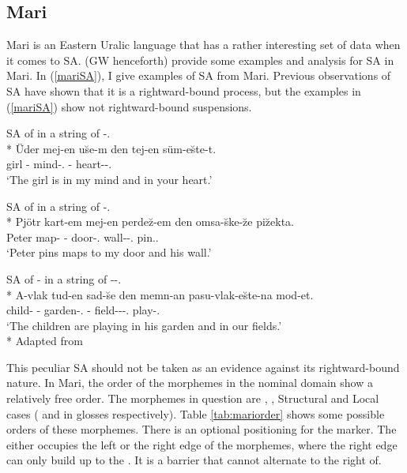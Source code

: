 \subsection{Mari}

Mari is an Eastern Uralic language that has a rather interesting set of data when it comes to SA. \citet{guseva2017postsyntactic} (GW henceforth) provide some examples and analysis for SA in Mari. In (\ref{mariSA}), I give examples of SA from Mari. Previous observations of SA have shown that it is a rightward-bound process, but the examples in (\ref{mariSA}) show not rightward-bound suspensions.

\begin{exe}
    \ex \label{mariSA}
    \begin{xlist}
        \ex SA of {\Iness} in a string of {\Iness}-{\Poss}.{\Ssg}\\*
        \gll Üder mej-en u\u{s}e-m den tej-en süm-e\u{s}te-t. \\ 
        girl {\Fsg}-{\Gen} mind-{\Poss}.{\Fsg} {\And} {\Ssg}-{\Gen} heart-{\Iness}-{\Poss}.{\Ssg} \\
        \glt `The girl is in my mind and in your heart.'
        
        \ex SA of {\Ill} in a string of {\Ill}-{\Poss}.{\Tsg}\\*
        \gll Pjötr kart-em mej-en perde\u{z}-em den omsa-\u{s}ke-\u{z}e pi\u{z}ekta. \\ 
        Peter map-{\Acc} {\Fsg}-{\Gen} door-{\Poss}.{\Fsg} {\And} wall-{\Ill}-{\Poss}.{\Tsg} pin.{\Tsg}.{\Prs}\\
        \glt `Peter pins maps to my door and his wall.'
   
        \ex SA of {\Pl}-{\Iness} in a string of {\Pl}-{\Iness}-{\Poss}.{\Fpl}\\*
        \gll A-vlak tud-en sad-\u{s}e den memn-an pasu-vlak-e\u{s}te-na mod-et. \\ 
        child-{\Pl} {\Tsg}-{\Gen} garden-{\Poss}.{\Tsg} {\And} {\Fpl}-{\Gen} field-{\Pl}-{\Iness}-{\Poss}.{\Fpl} play-{\Tpl}.{\Prs} \\
        \glt `The children are playing in his garden and in our fields.'\\*
        \hfill Adapted from \citet{guseva2017postsyntactic}
    \end{xlist}     
\end{exe}

This peculiar SA should not be taken as an evidence against its rightward-bound nature. In Mari, the order of the morphemes in the nominal domain show a relatively free order. The morphemes in question are {\Pl}, {\Poss}, Structural and Local cases ({\Scase} and {\Lcase} in glosses respectively). Table \ref{tab:mariorder} shows some possible orders of these morphemes. There is an optional positioning for the {\Poss} marker. The {\Poss} either occupies the left or the right edge of the morphemes, where the right edge can only build up to the {\Scase}. It is a barrier that {\Poss} cannot alternate to the right of.

